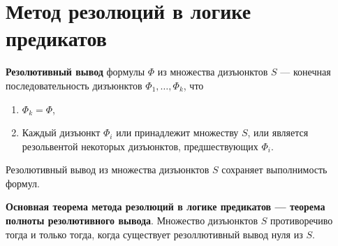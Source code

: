 \section{Метод резолюций в логике предикатов}
\dftion \textbf{Резолютивный вывод} формулы $\Phi$ из множества дизъюнктов $S$ --- конечная последовательность дизъюнктов $\Phi_1, \dots, \Phi_k$, что

\begin{enumerate}
    \item $\Phi_k = \Phi$,
    \item Каждый дизъюнкт $\Phi_i$ или принадлежит множеству $S$, или является резольвентой некоторых дизъюнктов, предшествующих $\Phi_i$.
\end{enumerate}

Резолютивный вывод из множества дизъюнктов $S$ сохраняет выполнимость формул.

\textbf{Основная теорема метода резолюций в логике предикатов --- теорема полноты резолютивного вывода}. Множество дизъюнктов $S$ противоречиво тогда и только тогда, когда существует резоллютивный вывод нуля из $S$.